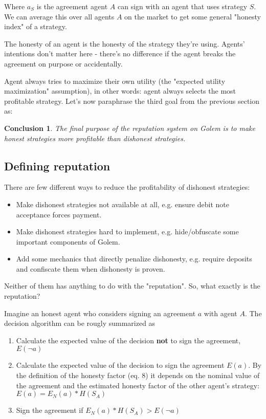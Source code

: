 \documentclass{article}
\newtheorem{conclusion}{Conclusion}[section]
\begin{document}
Where $a_S$ is the agreement agent $A$ can sign with an agent that uses strategy $S$.
We can average this over all agents $A$ on the market to get some general "honesty index" of a strategy.

The honesty of an agent is the honesty of the strategy they're using. 
Agents' intentions don't matter here - there's no difference if the agent breaks the agreement on purpose or accidentally.

Agent always tries to maximize their own utility (the "expected utility maximization" assumption), in other words: agent always selects the most profitable strategy.
Let's now paraphrase the third goal from the previous section as:

\begin{conclusion}

The final purpose of the reputation system on Golem is to make honest strategies more profitable than dishonest strategies.

\label{main purpose conclusion}
\end{conclusion}


\subsection{Defining reputation}

There are few different ways to reduce the profitability of dishonest strategies:

\begin{itemize}
\item{Make dishonest strategies not available at all, e.g. ensure debit note acceptance forces payment.}
\item{Make dishonest strategies hard to implement, e.g. hide/obfuscate some important components of Golem.}
\item{Add some mechanics that directly penalize dishonesty, e.g. require deposits and confiscate them when dishonesty is proven.}
\end{itemize}

Neither of them has anything to do with the "reputation". So, what exactly is the reputation?

Imagine an honest agent who considers signing an agreement $a$ with agent $A$. The decision algorithm can be rougly summarized as
\begin{enumerate}
\item{Calculate the expected value of the decision \textbf{not} to sign the agreement, $E(\neg a)$}
\item{Calculate the expected value of the decision to sign the agreement $E(a)$. 
    By the definition of the honesty factor (eq. 8) it depends on the nominal value of the agreement 
    and the estimated honesty factor of the other agent's strategy: $E(a) = E_N(a) * H(S_A)$}
\item{Sign the agreement if $E_N(a) * H(S_A) > E(\neg a)$}
\end{enumerate}
\end{document}
